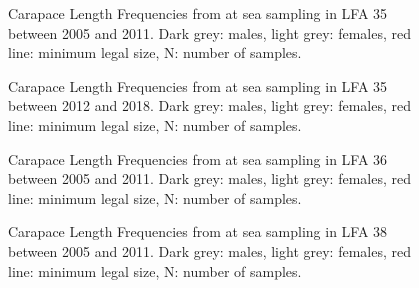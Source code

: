 \documentclass[11pt]{article}
\newcommand{\e}{\string~/bio.data/bio.lobster/figures/LFA3438Framework2019/figures/} %
\begin{document}
    \begin{figure}
    \centering
        \caption{Carapace Length Frequencies from at sea sampling in LFA 35 between 2005 and 2011. Dark grey: males, light grey: females, red line: minimum legal size, N: number of samples.}

    \end{figure}

   \begin{figure}
    \centering
        \caption{Carapace Length Frequencies from at sea sampling in LFA 35 between 2012 and 2018. Dark grey: males, light grey: females, red line: minimum legal size, N: number of samples.}

    \end{figure}

   \begin{figure}
    \centering
        \caption{Carapace Length Frequencies from at sea sampling in LFA 36 between 2005 and 2011. Dark grey: males, light grey: females, red line: minimum legal size, N: number of samples.}

    \end{figure}

   \begin{figure}
    \centering
        \caption{Carapace Length Frequencies from at sea sampling in LFA 38 between 2005 and 2011. Dark grey: males, light grey: females, red line: minimum legal size, N: number of samples.}

    \end{figure}
\end{document}
